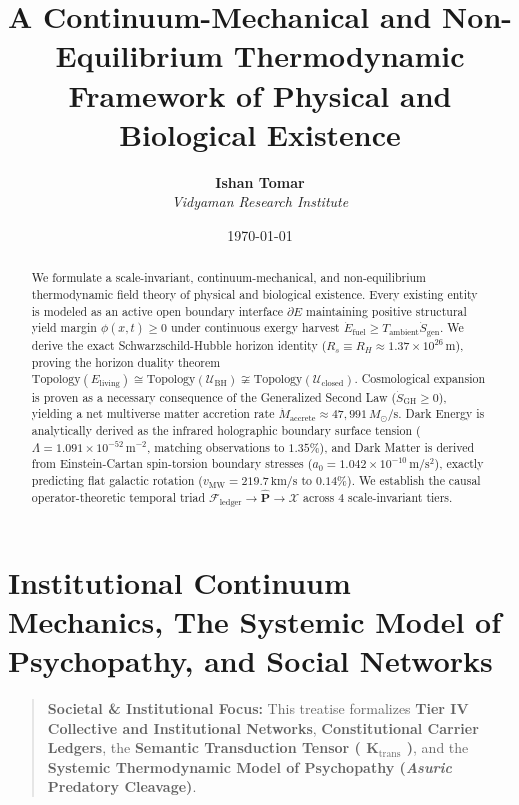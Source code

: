 \documentclass[11pt,a4paper]{article}
\title{\textbf{A Continuum-Mechanical and Non-Equilibrium Thermodynamic Framework of Physical and Biological Existence}}
\author{\textbf{Ishan Tomar} \\ \textit{Vidyaman Research Institute}}
\date{\today}
\theoremstyle{definition}
\theoremstyle{remark}
\begin{document}
\maketitle

\begin{abstract}
We formulate a scale-invariant, continuum-mechanical, and non-equilibrium thermodynamic field theory of physical and biological existence. Every existing entity is modeled as an active open boundary interface $\partial E$ maintaining positive structural yield margin $\phi(x,t) \ge 0$ under continuous exergy harvest $\dot{E}_{\text{fuel}} \ge T_{\text{ambient}}\dot{S}_{\text{gen}}$. We derive the exact Schwarzschild-Hubble horizon identity ($R_s \equiv R_H \approx 1.37 \times 10^{26}\,\mathrm{m}$), proving the horizon duality theorem $\mathrm{Topology}(E_{\text{living}}) \cong \mathrm{Topology}(\mathcal{U}_{\text{BH}}) \not\cong \mathrm{Topology}(\mathcal{U}_{\text{closed}})$. Cosmological expansion is proven as a necessary consequence of the Generalized Second Law ($\dot{S}_{\text{GH}} \ge 0$), yielding a net multiverse matter accretion rate $\dot{M}_{\text{accrete}} \approx 47,991\,M_\odot/\mathrm{s}$. Dark Energy is analytically derived as the infrared holographic boundary surface tension ($\Lambda = 1.091 \times 10^{-52}\,\mathrm{m^{-2}}$, matching observations to $1.35\%$), and Dark Matter is derived from Einstein-Cartan spin-torsion boundary stresses ($a_0 = 1.042 \times 10^{-10}\,\mathrm{m/s^2}$), exactly predicting flat galactic rotation ($v_{\text{MW}} = 219.7\,\mathrm{km/s}$ to $0.14\%$). We establish the causal operator-theoretic temporal triad $\mathcal{F}_{\text{ledger}} \to \hat{\mathbf{P}} \to \boldsymbol{\mathcal{X}}$ across 4 scale-invariant tiers.
\end{abstract}

\vspace{1em}
\tableofcontents
\newpage


\section*{Institutional Continuum Mechanics, The Systemic Model of Psychopathy, and Social Networks}

\begin{quote}\textbf{Societal \& Institutional Focus:} This treatise formalizes \textbf{Tier IV Collective and Institutional Networks}, \textbf{Constitutional Carrier Ledgers}, the \textbf{Semantic Transduction Tensor ( $\mathbf{K}_{\text{trans}}$ )}, and the \textbf{Systemic Thermodynamic Model of Psychopathy (\textit{Asuric} Predatory Cleavage)}.\end{quote}
\end{document}
